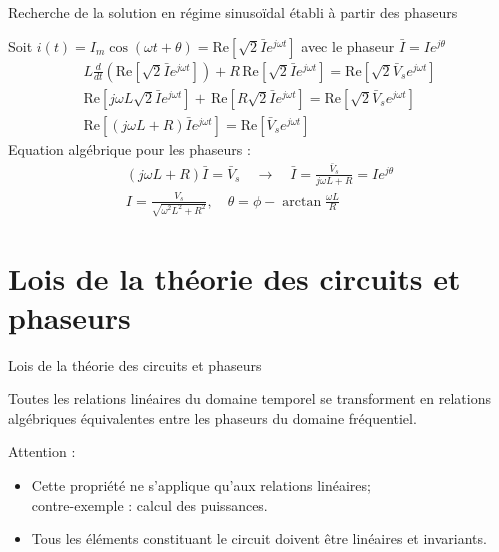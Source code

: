 
\begin{frame}{\large Recherche de la solution en régime sinusoïdal établi à partir des
		phaseurs}
	
	Soit $i(t)=I_m\cos(\omega t+\theta)=\text{Re}[\sqrt{2}\bar{I}e^{j\omega t}]$
	avec le phaseur $\bar{I}=I e^{j\theta}$
	\begin{gather*}
	L\frac{d}{dt}\left(\text{Re}[\sqrt{2}\bar{I}e^{j\omega t}]\right)+R\, \text{Re}
	[\sqrt{2}\bar{I}e^{j\omega t}]= \text{Re}[\sqrt{2}\bar{V}_se^{j\omega t}]\\
	\text{Re}[j\omega L \sqrt{2}\bar{I}e^{j\omega t}]+ \, \text{Re}
	[R\sqrt{2} \bar{I}e^{j\omega t}]= \text{Re}[\sqrt{2}\bar{V}_se^{j\omega t}]\\
	\text{Re}[(j\omega L+R)  \bar{I}e^{j\omega t}]= \text{Re}[\bar{V}_se^{j\omega t}]
	\end{gather*}
	Equation \alert{algébrique} pour les phaseurs :
	\begin{gather*}
	(j\omega L+R)  \bar{I}=\bar{V}_s \quad \rightarrow \quad \bar{I} =
	\frac{\bar{V}_s}{j\omega L+R}=I e^{j\theta}\\
	I =\frac{V_{s}}{\sqrt{\omega^2 L^2+ R^2}}, \quad \theta = \phi -
	\arctan \frac{\omega L}{R}
	\end{gather*}
\end{frame}


\section{Lois de la théorie des circuits et phaseurs}
\begin{frame}{Lois de la théorie des circuits et phaseurs}
	
	Toutes les relations linéaires du domaine temporel se transforment en
	relations algébriques équivalentes entre les phaseurs du domaine
	fréquentiel.
	\vfill
	
	\begin{block}{Attention :}
		\begin{itemize}
			\item Cette propriété ne s'applique qu'aux
			relations linéaires; \\contre-exemple : calcul des puissances. 
			\item Tous les éléments constituant le circuit doivent être linéaires et
			invariants.
		\end{itemize}
	\end{block}
	\end{frame}
	
